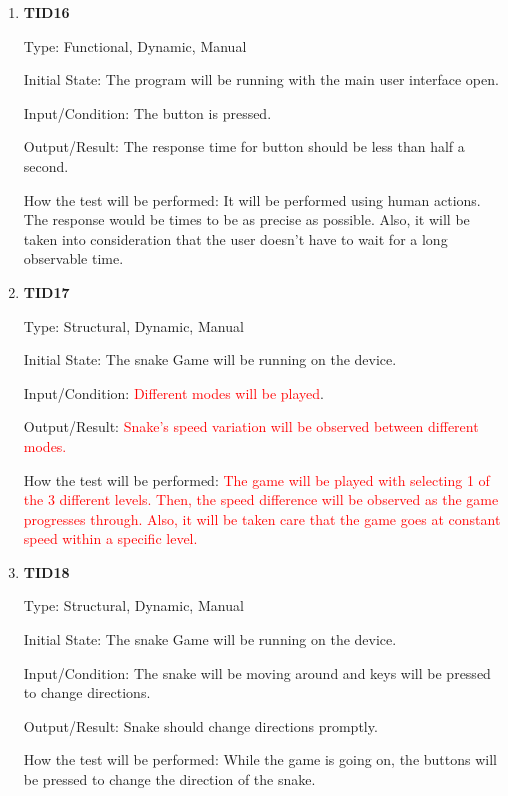 \documentclass[12pt, titlepage]{article}
\begin{document}
\begin{enumerate}
	
	\item{\textbf{TID16}\\}
	
	Type:  Functional, Dynamic, Manual
	
	Initial State: The program will be running with the main user interface open.
	
	Input/Condition: The button is pressed.
	
	Output/Result: The response time for button should be less than half a second.
	
	How the test will be performed: It will be performed using human actions. The response would be times to be as precise as possible. Also, it will be taken into consideration that the user doesn't have to wait for a long observable time.
	
	\item{\textbf{TID17}\\}
	
	Type: Structural, Dynamic, Manual 
	
	Initial State: The snake Game will be running on the device.
	
	Input/Condition: \textcolor{red}{Different modes will be played}.
	
	Output/Result: \textcolor{red}{Snake's speed variation will be observed between different modes.}
	
	How the test will be performed: \textcolor{red}{The game will be played with selecting 1 of the 3 different levels. Then, the speed difference will be observed as the game progresses through. Also, it will be taken care that the game goes at constant speed within a specific level.}
	
	\item{\textbf{TID18}\\}
	
	Type: Structural, Dynamic, Manual 
	
	Initial State: The snake Game will be running on the device.
	
	Input/Condition: The snake will be moving around and keys will be pressed to change directions.
	
	Output/Result: Snake should change directions promptly.
	
	How the test will be performed: While the game is going on, the buttons will be pressed to change the direction of the snake.
	
	
\end{enumerate}
\end{document}
